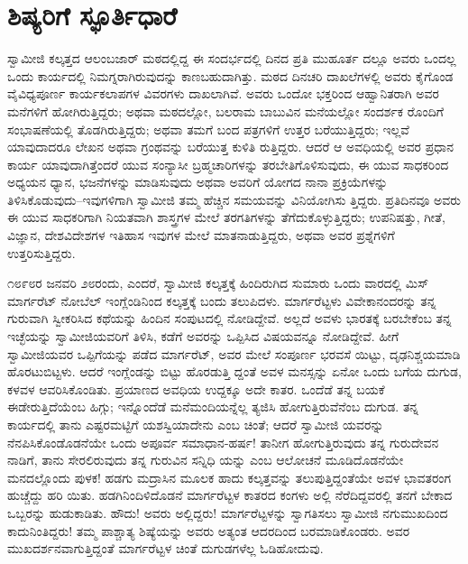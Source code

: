 
\chapter{ಶಿಷ್ಯರಿಗೆ ಸ್ಫೂರ್ತಿಧಾರೆ}

\noindent

ಸ್ವಾಮೀಜಿ ಕಲ್ಕತ್ತದ ಆಲಂಬಜಾರ್ ಮಠದಲ್ಲಿದ್ದ ಈ ಸಂದರ್ಭದಲ್ಲಿ ದಿನದ ಪ್ರತಿ ಮುಹೂರ್ತ ದಲ್ಲೂ ಅವರು ಒಂದಲ್ಲ ಒಂದು ಕಾರ್ಯದಲ್ಲಿ ನಿಮಗ್ನರಾಗಿರುವುದನ್ನು ಕಾಣಬಹುದಾಗಿತ್ತು. ಮಠದ ದಿನಚರಿ ದಾಖಲೆಗಳಲ್ಲಿ ಅವರು ಕೈಗೊಂಡ ವೈವಿಧ್ಯಪೂರ್ಣ ಕಾರ್ಯಕಲಾಪಗಳ ವಿವರಗಳು ದಾಖಲಾಗಿವೆ. ಅವರು ಒಂದೋ ಭಕ್ತರಿಂದ ಆಹ್ವಾನಿತರಾಗಿ ಅವರ ಮನೆಗಳಿಗೆ ಹೋಗಿರುತ್ತಿದ್ದರು; ಅಥವಾ ಮಠದಲ್ಲೋ, ಬಲರಾಮ ಬಾಬುವಿನ ಮನೆಯಲ್ಲೋ ಸಂದರ್ಶಕ ರೊಂದಿಗೆ ಸಂಭಾಷಣೆಯಲ್ಲಿ ತೊಡಗಿರುತ್ತಿದ್ದರು; ಅಥವಾ ತಮಗೆ ಬಂದ ಪತ್ರಗಳಿಗೆ ಉತ್ತರ ಬರೆಯುತ್ತಿದ್ದರು; ಇಲ್ಲವೆ ಯಾವುದಾದರೂ ಲೇಖನ ಅಥವಾ ಗ್ರಂಥವನ್ನು ಬರೆಯುತ್ತ ಕುಳಿತಿ ರುತ್ತಿದ್ದರು. ಆದರೆ ಆ ಅವಧಿಯಲ್ಲಿ ಅವರ ಪ್ರಧಾನ ಕಾರ್ಯ ಯಾವುದಾಗಿತ್ತೆಂದರೆ ಯುವ ಸಂನ್ಯಾಸೀ ಬ್ರಹ್ಮಚಾರಿಗಳನ್ನು ತರಬೇತಿಗೊಳಿಸುವುದು, ಈ ಯುವ ಸಾಧಕರಿಂದ ಅಧ್ಯಯನ ಧ್ಯಾನ, ಭಜನೆಗಳನ್ನು ಮಾಡಿಸುವುದು ಅಥವಾ ಅವರಿಗೆ ಯೋಗದ ನಾನಾ ಪ್ರಕ್ರಿಯೆಗಳನ್ನು ತಿಳಿಸಿಕೊಡುವುದು–ಇವುಗಳಿಗಾಗಿ ಸ್ವಾಮೀಜಿ ತಮ್ಮ ಹೆಚ್ಚಿನ ಸಮಯವನ್ನು ವಿನಿಯೋಗಿಸು ತ್ತಿದ್ದರು. ಪ್ರತಿದಿನವೂ ಅವರು ಈ ಯುವ ಸಾಧಕರಿಗಾಗಿ ನಿಯತವಾಗಿ ಶಾಸ್ತ್ರಗಳ ಮೇಲೆ ತರಗತಿಗಳನ್ನು ತೆಗೆದುಕೊಳ್ಳುತ್ತಿದ್ದರು; ಉಪನಿಷತ್ತು, ಗೀತೆ, ವಿಜ್ಞಾನ, ದೇಶವಿದೇಶಗಳ ಇತಿಹಾಸ ಇವುಗಳ ಮೇಲೆ ಮಾತನಾಡುತ್ತಿದ್ದರು, ಅಥವಾ ಅವರ ಪ್ರಶ್ನೆಗಳಿಗೆ ಉತ್ತರಿಸುತ್ತಿದ್ದರು.

೧೮೯೮ರ ಜನವರಿ ೨೮ರಂದು, ಎಂದರೆ, ಸ್ವಾಮೀಜಿ ಕಲ್ಕತ್ತಕ್ಕೆ ಹಿಂದಿರುಗಿದ ಸುಮಾರು ಒಂದು ವಾರದಲ್ಲಿ ಮಿಸ್ ಮಾರ್ಗರೆಟ್ ನೋಬೆಲ್ ಇಂಗ್ಲೆಂಡಿನಿಂದ ಕಲ್ಕತ್ತಕ್ಕೆ ಬಂದು ತಲುಪಿದಳು. ಮಾರ್ಗರೆಟ್ಟಳು ವಿವೇಕಾನಂದರನ್ನು ತನ್ನ ಗುರುವಾಗಿ ಸ್ವೀಕರಿಸಿದ ಕಥೆಯನ್ನು ಹಿಂದಿನ ಸಂಪುಟದಲ್ಲಿ ನೋಡಿದ್ದೇವೆ. ಅಲ್ಲದೆ ಅವಳು ಭಾರತಕ್ಕೆ ಬರಬೇಕೆಂಬ ತನ್ನ ಇಚ್ಛೆಯನ್ನು ಸ್ವಾಮೀಜಿಯವರಿಗೆ ತಿಳಿಸಿ, ಕಡೆಗೆ ಅವರನ್ನು ಒಪ್ಪಿಸಿದ ವಿಷಯವನ್ನೂ ನೋಡಿದ್ದೇವೆ. ಹೀಗೆ ಸ್ವಾಮೀಜಿಯವರ ಒಪ್ಪಿಗೆಯನ್ನು ಪಡೆದ ಮಾರ್ಗರೆಟ್, ಅವರ ಮೇಲೆ ಸಂಪೂರ್ಣ ಭರವಸೆ ಯಿಟ್ಟು, ದೃಢನಿಶ್ಚಯಮಾಡಿ ಹೊರಟುಬಿಟ್ಟಳು. ಆದರೆ ಇಂಗ್ಲೆಂಡನ್ನು ಬಿಟ್ಟು ಹೊರಡುತ್ತಿ ದ್ದಂತೆ ಅವಳ ಮನಸ್ಸನ್ನು ಏನೋ ಒಂದು ಬಗೆಯ ದುಗುಡ, ಕಳವಳ ಆವರಿಸಿಕೊಂಡಿತು. ಪ್ರಯಾಣದ ಅವಧಿಯ ಉದ್ದಕ್ಕೂ ಅದೇ ಕಾತರ. ಒಂದೆಡೆ ತನ್ನ ಬಯಕೆ ಈಡೇರುತ್ತಿದೆಯೆಂಬ ಹಿಗ್ಗು; ಇನ್ನೊಂದೆಡೆ ಮನೆಮಂದಿಯನ್ನೆಲ್ಲ ತ್ಯಜಿಸಿ ಹೋಗುತ್ತಿರುವೆನೆಂಬ ದುಗುಡ. ತನ್ನ ಕಾರ್ಯದಲ್ಲಿ ತಾನು ಎಷ್ಟರಮಟ್ಟಿಗೆ ಯಶಸ್ವಿಯಾದೇನು ಎಂಬ ಚಿಂತೆ; ಆದರೆ ಸ್ವಾಮೀಜಿ ಯವರನ್ನು ನೆನಪಿಸಿಕೊಂಡೊಡನೆಯೇ ಒಂದು ಅಪೂರ್ವ ಸಮಾಧಾನ-ಹರ್ಷ! ತಾನೀಗ ಹೋಗುತ್ತಿರುವುದು ತನ್ನ ಗುರುದೇವನ ನಾಡಿಗೆ, ತಾನು ಸೇರಲಿರುವುದು ತನ್ನ ಗುರುವಿನ ಸನ್ನಿಧಿ ಯನ್ನು ಎಂಬ ಆಲೋಚನೆ ಮೂಡಿದೊಡನೆಯೇ ಮನದಲ್ಲೊಂದು ಪುಳಕ! ಹಡಗು ಮದ್ರಾಸಿನ ಮೂಲಕ ಹಾದು ಕಲ್ಕತ್ತವನ್ನು ತಲುಪುತ್ತಿದ್ದಂತೆಯೇ ಅವಳ ಭಾವತರಂಗ ಹುಚ್ಚೆದ್ದು ಹರಿ ಯಿತು. ಹಡಗಿನಿಂದಿಳಿದೊಡನೆ ಮಾರ್ಗರೆಟ್ಟಳ ಕಾತರದ ಕಂಗಳು ಅಲ್ಲಿ ನೆರೆದಿದ್ದವರಲ್ಲಿ ತನಗೆ ಬೇಕಾದ ಒಬ್ಬರನ್ನು ಹುಡುಕಾಡಿತು. ಹೌದು! ಅವರು ಅಲ್ಲಿದ್ದರು! ಮಾರ್ಗರೆಟ್ಟಳನ್ನು ಸ್ವಾಗತಿಸಲು ಸ್ವಾಮೀಜಿ ನಗುಮುಖದಿಂದ ಕಾದುನಿಂತಿದ್ದರು! ತಮ್ಮ ಪಾಶ್ಚಾತ್ಯ ಶಿಷ್ಯೆಯನ್ನು ಅವರು ಅತ್ಯಂತ ಆದರದಿಂದ ಬರಮಾಡಿಕೊಂಡರು. ಅವರ ಮುಖದರ್ಶನವಾಗುತ್ತಿದ್ದಂತೆ ಮಾರ್ಗರೆಟ್ಟಳ ಚಿಂತೆ ದುಗುಡಗಳೆಲ್ಲ ಓಡಿಹೋದುವು.

